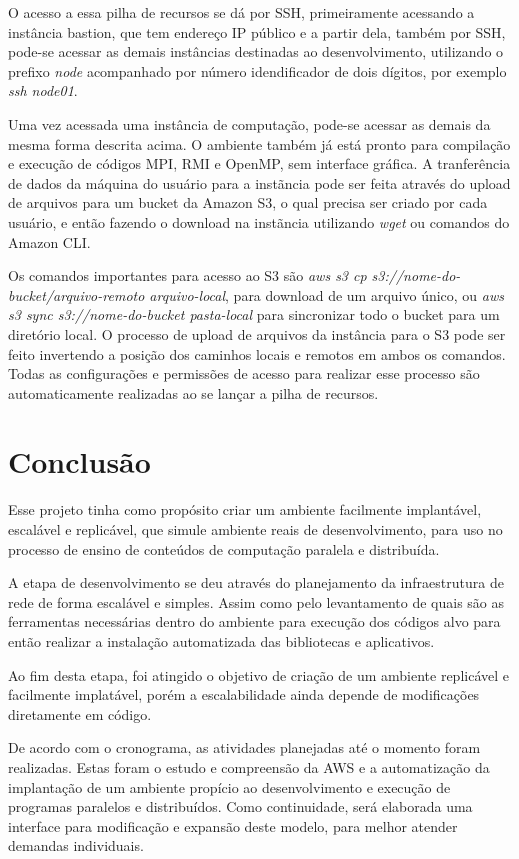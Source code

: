 \documentclass[tg]{mdtufsm}
\begin{document}
O acesso a essa pilha de recursos se dá por SSH, primeiramente acessando a instância bastion, que tem endereço IP público e a partir dela, também por SSH, pode-se acessar as demais instâncias destinadas ao desenvolvimento, utilizando o prefixo \emph{node} acompanhado por número idendificador de dois dígitos, por exemplo \emph{ssh node01}.

Uma vez acessada uma instância de computação, pode-se acessar as demais da mesma forma descrita acima. O ambiente também já está pronto para compilação e execução de códigos MPI, RMI e OpenMP, sem interface gráfica. A tranferência de dados da máquina do usuário para a instãncia pode ser feita através do upload de arquivos para um bucket da Amazon S3, o qual precisa ser criado por cada usuário, e então fazendo o download na instãncia utilizando \emph{wget} ou comandos do Amazon CLI.

Os comandos importantes para acesso ao S3 são \emph{aws s3 cp s3://nome-do-bucket/arquivo-remoto arquivo-local}, para download de um arquivo único, ou \emph{aws s3 sync s3://nome-do-bucket pasta-local} para sincronizar todo o bucket para um diretório local. O processo de upload de arquivos da instância para o S3 pode ser feito invertendo a posição dos caminhos locais e remotos em ambos os comandos. Todas as configurações e permissões de acesso para realizar esse processo são automaticamente realizadas ao se lançar a pilha de recursos.

\chapter{Conclusão}

Esse projeto tinha como propósito criar um ambiente facilmente implantável, escalável e replicável, que simule ambiente reais de desenvolvimento, para uso no processo de ensino de conteúdos de computação paralela e distribuída.

A etapa de desenvolvimento se deu através do planejamento da infraestrutura de rede de forma escalável e simples. Assim como pelo levantamento de quais são as ferramentas necessárias dentro do ambiente para execução dos códigos alvo para então realizar a instalação automatizada das bibliotecas e aplicativos.

Ao fim desta etapa, foi atingido o objetivo de criação de um ambiente replicável e facilmente implatável, porém a escalabilidade ainda depende de modificações diretamente em código.

De acordo com  o cronograma, as atividades planejadas até o momento foram realizadas. Estas foram o estudo e compreensão da AWS e a automatização da implantação de um ambiente propício ao desenvolvimento e execução de programas paralelos e distribuídos. Como continuidade, será elaborada uma interface para modificação e expansão deste modelo, para melhor atender demandas individuais.


\setlength{\baselineskip}{\baselineskip}


\end{document}
